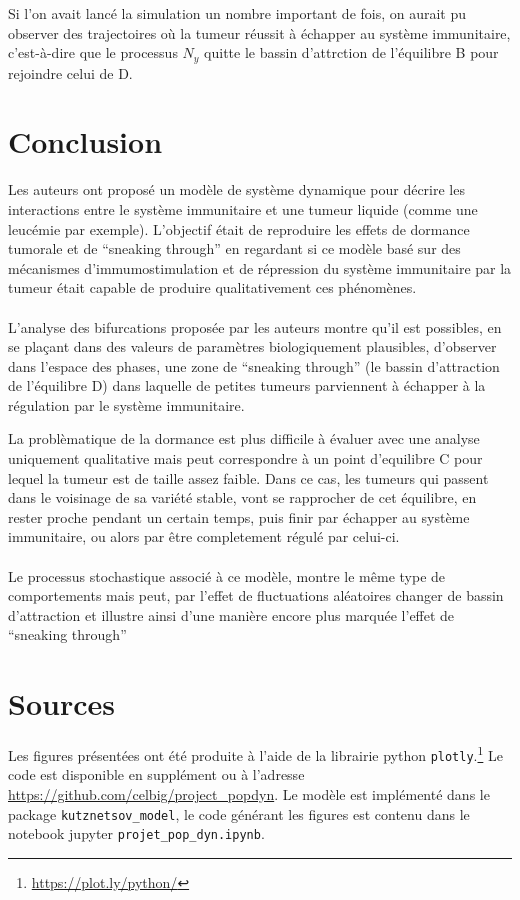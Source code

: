 \documentclass[12pt]{article}
\begin{document}
Si l'on avait lanc\'e la simulation un nombre important de fois, on aurait pu observer des trajectoires o\`u la tumeur r\'eussit \`a \'echapper au syst\`eme immunitaire, c'est-\`a-dire que le processus $N_y$ quitte le bassin d'attrction de l'\'equilibre B pour rejoindre celui de D. 


\section*{Conclusion}
Les auteurs ont proposé un mod\`ele de syst\`eme dynamique pour d\'ecrire les interactions entre le syst\`eme immunitaire et une tumeur liquide (comme une leuc\'emie par exemple). L'objectif \'etait de reproduire les effets de dormance tumorale et de ``sneaking through'' en regardant si ce mod\`ele bas\'e sur des m\'ecanismes d'immumostimulation et de r\'epression du syst\`eme immunitaire par la tumeur \'etait capable de produire qualitativement ces ph\'enom\`enes.

\paragraph{} L'analyse des bifurcations propos\'ee par les auteurs montre qu'il est possibles, en se plaçant dans des valeurs de param\`etres biologiquement plausibles, d'observer dans l'espace des phases, une zone de ``sneaking through'' (le bassin d'attraction de l'\'equilibre D) dans laquelle de petites tumeurs parviennent \`a \'echapper \`a la r\'egulation par le syst\`eme immunitaire. 

La probl\`ematique de la dormance est plus difficile \`a \'evaluer avec une analyse uniquement qualitative mais peut correspondre \`a un point d'equilibre C pour lequel la tumeur est de taille assez faible. Dans ce cas, les tumeurs qui passent dans le voisinage de sa vari\'et\'e stable, vont se rapprocher de cet \'equilibre, en rester proche pendant un certain temps, puis finir par \'echapper au syst\`eme immunitaire, ou alors par être completement r\'egul\'e par celui-ci.

\paragraph{}
Le processus stochastique associ\'e \`a ce mod\`ele, montre le m\^eme type de comportements mais peut, par l'effet de fluctuations al\'eatoires changer de bassin d'attraction et illustre ainsi d'une mani\`ere encore plus marqu\'ee l'effet de ``sneaking through''

\section*{Sources}
Les figures présentées ont été produite  à l'aide de la librairie python \texttt{plotly}.\footnote{\url{https://plot.ly/python/}} Le code est disponible en supplément ou à l'adresse \url{https://github.com/celbig/project_popdyn}. Le modèle est implémenté dans le package \texttt{kutznetsov\_model}, le code générant les figures est contenu dans le notebook jupyter \texttt{projet\_pop\_dyn.ipynb}.

\clearpage


\end{document}
